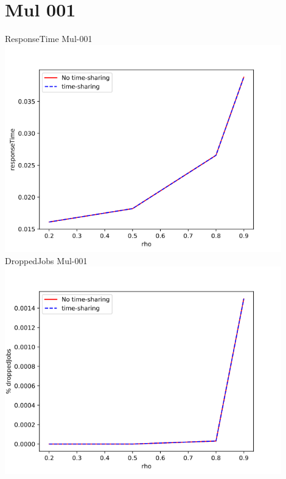 \documentclass[a4paper]{article}
\begin{document}
\section*{Mul 001}
\begin{center}
ResponseTime Mul-001 \\
\includegraphics[width=0.9\textwidth]{TsVSNoTs-Mul_001-responseTime.png}
DroppedJobs Mul-001 \\
\includegraphics[width=0.9\textwidth]{TsVSNoTs-Mul_001-droppedJobs.png}
\newpage

\end{center}
\end{document}
